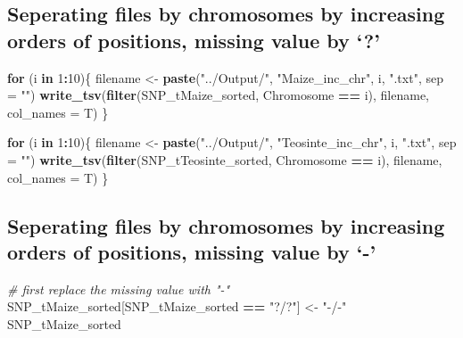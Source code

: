 \documentclass[]{article}
\newenvironment{Shaded}{\begin{snugshade}}{\end{snugshade}}
\newcommand{\KeywordTok}[1]{\textcolor[rgb]{0.13,0.29,0.53}{\textbf{#1}}}
\newcommand{\DataTypeTok}[1]{\textcolor[rgb]{0.13,0.29,0.53}{#1}}
\newcommand{\DecValTok}[1]{\textcolor[rgb]{0.00,0.00,0.81}{#1}}
\newcommand{\StringTok}[1]{\textcolor[rgb]{0.31,0.60,0.02}{#1}}
\newcommand{\CommentTok}[1]{\textcolor[rgb]{0.56,0.35,0.01}{\textit{#1}}}
\newcommand{\ControlFlowTok}[1]{\textcolor[rgb]{0.13,0.29,0.53}{\textbf{#1}}}
\newcommand{\OperatorTok}[1]{\textcolor[rgb]{0.81,0.36,0.00}{\textbf{#1}}}
\newcommand{\NormalTok}[1]{#1}
\begin{document}
\subsection{\texorpdfstring{Seperating files by chromosomes by
increasing orders of positions, missing value by
`?'}{Seperating files by chromosomes by increasing orders of positions, missing value by ?}}\label{seperating-files-by-chromosomes-by-increasing-orders-of-positions-missing-value-by}

\begin{Shaded}
\begin{Highlighting}[]
\ControlFlowTok{for}\NormalTok{ (i }\ControlFlowTok{in} \DecValTok{1}\OperatorTok{:}\DecValTok{10}\NormalTok{)\{}
\NormalTok{  filename <-}\StringTok{ }\KeywordTok{paste}\NormalTok{(}\StringTok{"../Output/"}\NormalTok{, }\StringTok{"Maize_inc_chr"}\NormalTok{, i, }\StringTok{".txt"}\NormalTok{, }\DataTypeTok{sep =} \StringTok{""}\NormalTok{)}
  \KeywordTok{write_tsv}\NormalTok{(}\KeywordTok{filter}\NormalTok{(SNP_tMaize_sorted, Chromosome }\OperatorTok{==}\StringTok{ }\NormalTok{i), filename, }\DataTypeTok{col_names =}\NormalTok{ T)}
\NormalTok{\}}

\ControlFlowTok{for}\NormalTok{ (i }\ControlFlowTok{in} \DecValTok{1}\OperatorTok{:}\DecValTok{10}\NormalTok{)\{}
\NormalTok{  filename <-}\StringTok{ }\KeywordTok{paste}\NormalTok{(}\StringTok{"../Output/"}\NormalTok{, }\StringTok{"Teosinte_inc_chr"}\NormalTok{, i, }\StringTok{".txt"}\NormalTok{, }\DataTypeTok{sep =} \StringTok{""}\NormalTok{)}
  \KeywordTok{write_tsv}\NormalTok{(}\KeywordTok{filter}\NormalTok{(SNP_tTeosinte_sorted, Chromosome }\OperatorTok{==}\StringTok{ }\NormalTok{i), filename, }\DataTypeTok{col_names =}\NormalTok{ T)}
\NormalTok{\}}
\end{Highlighting}
\end{Shaded}

\subsection{\texorpdfstring{Seperating files by chromosomes by
increasing orders of positions, missing value by
`-'}{Seperating files by chromosomes by increasing orders of positions, missing value by -}}\label{seperating-files-by-chromosomes-by-increasing-orders-of-positions-missing-value-by--}

\begin{Shaded}
\begin{Highlighting}[]
\CommentTok{# first replace the missing value with "-"}
\NormalTok{SNP_tMaize_sorted[SNP_tMaize_sorted }\OperatorTok{==}\StringTok{ "?/?"}\NormalTok{] <-}\StringTok{ "-/-"}
\NormalTok{SNP_tMaize_sorted}
\end{Highlighting}
\end{Shaded}
\end{document}

